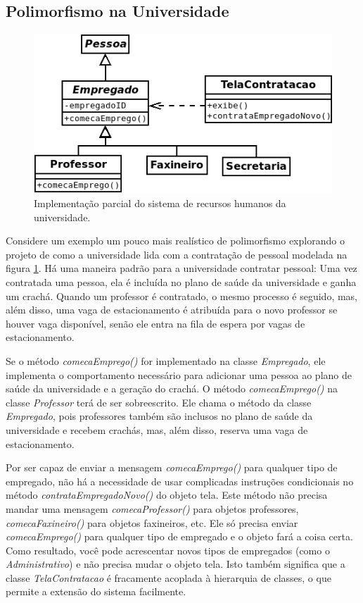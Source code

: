 \subsection{Polimorfismo na Universidade}
\begin{figure}
\begin{center}
\includegraphics[scale=0.65]{uniRH.png}
\end{center}
\caption{Implementação parcial do sistema de recursos humanos da universidade.} \label{fig:uniRH}
\end{figure}

Considere um exemplo um pouco mais realístico de polimorfismo explorando o projeto de como a universidade lida com a contratação de pessoal modelada na figura \ref{fig:uniRH}. Há uma maneira padrão para a universidade contratar pessoal: Uma vez contratada uma pessoa, ela é incluída no plano de saúde da universidade e ganha um crachá. Quando um professor é contratado, o mesmo processo é seguido, mas, além disso, uma vaga de estacionamento é atribuída para o novo professor se houver vaga disponível, senão ele entra na fila de espera por vagas de estacionamento.

Se o método \emph{comecaEmprego()} for implementado na classe \emph{Empregado}, ele implementa o comportamento necessário para adicionar uma pessoa ao plano de saúde da universidade e a geração do crachá. O método \emph{comecaEmprego()} na classe \emph{Professor} terá de ser sobreescrito. Ele chama o método da classe \emph{Empregado}, pois professores também são inclusos no plano de saúde da universidade e recebem crachás, mas, além disso, reserva uma vaga de estacionamento.

Por ser capaz de enviar a mensagem \emph{comecaEmprego()} para qualquer tipo de empregado, não há a necessidade de usar complicadas instruções condicionais no método \emph{contrataEmpregadoNovo()} do objeto tela. Este método não precisa mandar uma mensagem \emph{comecaProfessor()} para objetos professores, \emph{comecaFaxineiro()} para objetos faxineiros, etc. Ele só precisa enviar \emph{comecaEmprego()} para qualquer tipo de empregado e o objeto fará a coisa certa. Como resultado, você pode acrescentar novos tipos de empregados (como o \emph{Administrativo}) e não precisa mudar o objeto tela. Isto também significa que a classe \emph{TelaContratacao} é fracamente acoplada à hierarquia de classes, o que permite a extensão do sistema facilmente.

